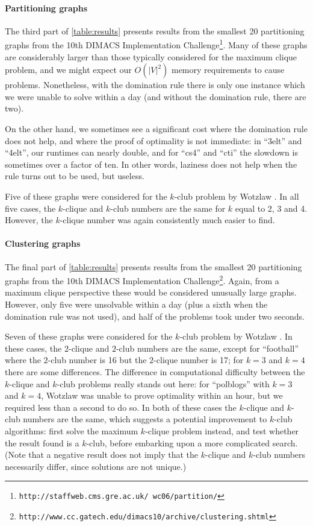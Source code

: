 \documentclass[letterpaper]{article}
\begin{document}
\paragraph{Partitioning graphs}

The third part of \cref{table:results} presents results from the smallest 20 partitioning graphs
from the 10th DIMACS Implementation
Challenge\footnote{\texttt{http://staffweb.cms.gre.ac.uk/~wc06/partition/}}.  Many of these graphs are
considerably larger than those typically considered for the maximum clique problem, and we might
expect our $O(|V|^2)$ memory requirements to cause problems. Nonetheless, with the domination rule
there is only one instance which we were unable to solve within a day (and without the domination
rule, there are two).

On the other hand, we sometimes see a significant cost where the domination rule does not help, and
where the proof of optimality is not immediate: in ``3elt'' and ``4elt'', our runtimes can nearly
double, and for ``cs4'' and ``cti'' the slowdown is sometimes over a factor of ten. In other words,
laziness does not help when the rule turns out to be used, but useless.

Five of these graphs were considered for the $k$-club problem by Wotzlaw \cite{Wotzlaw:2014}. In all
five cases, the $k$-clique and $k$-club numbers are the same for $k$ equal to 2, 3 and 4. However,
the $k$-clique number was again consistently much easier to find.


\paragraph{Clustering graphs}

The final part of \cref{table:results} presents results from the smallest 20 partitioning graphs
from the 10th DIMACS Implementation
Challenge\footnote{\texttt{http://www.cc.gatech.edu/dimacs10/archive/clustering.shtml}}. Again, from a
maximum clique perspective these would be considered unusually large graphs. However, only five were
unsolvable within a day (plus a sixth when the domination rule was not used), and half of the
problems took under two seconds.

Seven of these graphs were considered for the $k$-club problem by Wotzlaw \cite{Wotzlaw:2014}. In
these cases, the $2$-clique and $2$-club numbers are the same, except for ``football'' where the
$2$-club number is 16 but the $2$-clique number is 17; for $k = 3$ and $k = 4$ there are some
differences. The difference in computational difficulty between the $k$-clique and $k$-club problems
really stands out here: for ``polblogs'' with $k = 3$ and $k = 4$, Wotzlaw was unable to prove
optimality within an hour, but we required less than a second to do so. In both of these cases the
$k$-clique and $k$-club numbers are the same, which suggests a potential improvement to $k$-club
algorithms: first solve the maximum $k$-clique problem instead, and test whether the result found is
a $k$-club, before embarking upon a more complicated search. (Note that a negative result does not
imply that the $k$-clique and $k$-club numbers necessarily differ, since solutions are not unique.)
\end{document}
